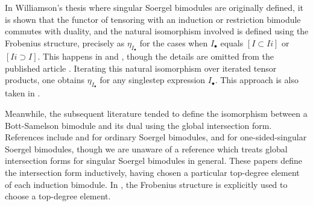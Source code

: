 \begin{remark}\label{rmk intersection forms in literature}
In Williamson's thesis \cite{WillThesis} where singular Soergel bimodules are originally defined, it is shown that the functor of tensoring with an induction or restriction bimodule commutes with duality, and the natural isomorphism involved is defined using the Frobenius structure, precisely as  $\eta_{I_\bullet}$ for the cases when $I_\bullet$ equals $[I \subset Ii]$ or $[Ii \supset I]$.  This happens in \cite[\S 3.2]{WillThesis} and \cite[Proposition 4.3.4]{WillThesis}, though the details are omitted from the published article \cite{WillSingular}. Iterating this natural isomorphism over iterated tensor products, one obtains $\eta_{I_\bullet}$ for any singlestep expression $I_\bullet$. This approach is also taken in \cite{BBE}.

Meanwhile, the subsequent literature tended to define the isomorphism between a Bott-Samelson bimodule and its dual using the global intersection form. References include \cite{EWHodge} and \cite{EMTW} for ordinary Soergel bimodules, and \cite[Appendix A]{patimo2021basesintersectioncohomologygrassmannian} for one-sided-singular Soergel bimodules, though we are unaware of a reference which treats global intersection forms for singular Soergel bimodules in general. These papers define the intersection form inductively, having chosen a particular top-degree element of each induction bimodule. In \cite[Appendix A]{patimo2021basesintersectioncohomologygrassmannian}, the Frobenius structure is explicitly used to choose a top-degree element.




    

    

\end{remark}

